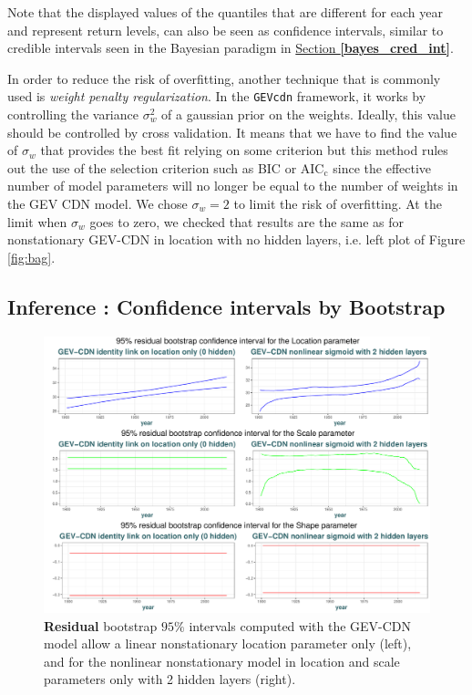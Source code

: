 Note that the displayed values of the quantiles that are different for each year and represent return levels, can also be seen as confidence intervals, similar to credible intervals seen in the Bayesian paradigm in \hyperref[bayes_cred_int]{Section \textbf{\ref{bayes_cred_int}}}.
 
  In order to reduce the risk of overfitting, another technique that is commonly used is  \emph{weight penalty regularization}. In the \texttt{GEVcdn} framework, it works by controlling the variance $\sigma^2_w$ of a gaussian prior on the weights. %
 Ideally, this value should be controlled by cross validation. It means that we have to find the value of $\sigma_w$ that provides the best fit relying on some criterion but this method rules out the use of the selection criterion such as BIC or $\text{AIC}_{\text{c}}$ since the effective number of model parameters will no longer be equal to the number of weights in the GEV CDN model. We chose $\sigma_w=2$ to limit the risk of overfitting. At the limit when $\sigma_w$ goes to zero, we checked that results are the same as for nonstationary GEV-CDN in location with no hidden layers, i.e. left plot of Figure \ref{fig:bag}.
 
 
\subsection{Inference : Confidence intervals by Bootstrap }\label{sec:boot}
 
 
 
 \begin{figure}[!htb]
   	\centering	\includegraphics[width=1.01\linewidth]{g_boot_res.pdf}\caption{\textbf{Residual} bootstrap $95\%$ intervals computed with the GEV-CDN model allow a linear nonstationary location parameter only (left), and for the nonlinear nonstationary model in location and scale parameters only with 2 hidden layers (right). }\label{fig:boot_res}
 \end{figure}
   
